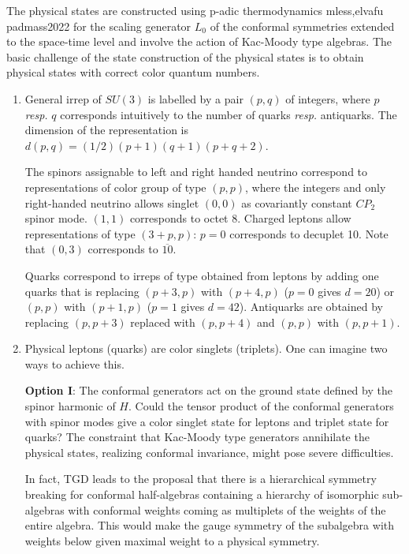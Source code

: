 \documentclass[10pt,epsf]{article}
\begin{document}
The  physical states are constructed using p-adic thermodynamics  \cite{allb}{mless,elvafu} \cite{btart}{padmass2022} for the scaling generator $L_0$ of the conformal symmetries extended to the space-time level and  involve the action of Kac-Moody type algebras. 
The  basic challenge of the state construction of the physical states  is to obtain physical states with correct color quantum numbers.  


\begin{enumerate}

\item  General irrep of $SU(3)$ is labelled by a pair $(p,q)$ of integers, where $p$ {\it  resp.} $q$ corresponds intuitively to the number of quarks {\it  resp.} antiquarks. The dimension of the representation  is $d(p,q)= (1/2)(p+1)(q+1)(p+q+2)$.

The spinors assignable to left and right handed neutrino correspond to representations of color group of type $(p,p)$, where the integers  and only right-handed neutrino allows singlet $(0,0)$ as covariantly constant $CP_2$ spinor mode. $(1,1)$ corresponds to octet 8.  Charged leptons allow representations of type $(3+p,p)$:   $p=0$ corresponds to decuplet 10. 
Note that $(0,3)$ corresponds to $\overline{10}$.

Quarks correspond to irreps of type obtained from leptons by adding one quarks that is replacing  $(p+3,p)$ with $(p+4,p)$ ($p=0$ gives $d=20$) or $(p,p)$ with $(p+1,p)$ ($p=1$ gives $d=42$).    Antiquarks are obtained by replacing $(p,p+3)$ replaced with $(p,p+4)$ and
$(p,p)$ with $(p,p+1)$.


\item Physical  leptons (quarks) are color singlets (triplets).  One can imagine two ways to achieve this.

{\bf Option I}: The  conformal generators act  on the ground state defined by  the spinor harmonic of $H$.  Could the tensor product of the conformal generators with  spinor modes give a color singlet state for leptons and triplet state for quarks?  The constraint that Kac-Moody type generators annihilate the physical states, realizing conformal invariance, might pose severe difficulties. 

In fact, TGD leads to the proposal that there is a hierarchical symmetry breaking for conformal half-algebras containing  a hierarchy of isomorphic sub-algebras with conformal weights coming  as multiplets of the weights of the entire algebra.  This would  make the gauge symmetry of the  subalgebra with weights below given maximal weight to a physical symmetry.


\end{enumerate}
\end{document}
